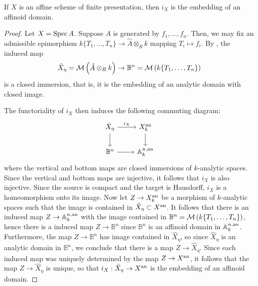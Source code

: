 \begin{lemma}\label{lemma:affinecaseisaffinoid}
    If $X$ is an affine scheme of finite presentation, then $i_X$ is the embedding of an affinoid domain.
\end{lemma}
\begin{proof}
    Let $X = \operatorname{Spec} A$.
    Suppose $A$ is generated by $f_1, \dots, f_n$.
    Then, we may fix an admissible epimorphism $k\{T_1, \dots, T_n\} \to \hat{A} \otimes_{R} k$ mapping $T_i \mapsto f_i$.
    By \parencite[Corollary 2.3.2]{berk1}, the induced map \[\hat{X}_{\eta} = \mathcal{M}\left(\hat{A} \otimes_{R} k\right) \to \mathbb{B}^{n} = \mathcal{M}\left(k\{T_1, \dots, T_n\}\right)\] is a closed immersion, that is, it is the embedding of an analytic domain with closed image.

    The functoriality of $i_X$ then induces the following commuting diagram:
    \[
    \begin{tikzcd}
        \hat{X}_{\eta} \arrow[d] \arrow[r,"i_X"]  & \anl{X_k} \arrow[d] \\
        \mathbb{B}^n \arrow[r] & \mathbb{A}^{n, \operatorname{an}}_{k}
    \end{tikzcd}
    \]
    where the vertical and bottom maps are closed immersions of $k$-analytic spaces.
    Since the vertical and bottom maps are injective, it follows that $i_X$ is also injective.
    Since the source is compact and the target is Hausdorff, $i_X$ is a homeomorphism onto its image.
    Now let $Z \to X_k^{\text{an}}$ be a morphism of $k$-analytic spaces such that the image is contained in $\hat{X}_{\eta} \subset X^{\text{an}}$.
    It follows that there is an induced map $Z \to \mathbb{A}^{n, \text{an}}_{k}$ with the image contained in $\mathbb{B}^{n} = \mathcal{M}\left(k\{T_1, \dots, T_n\}\right)$, hence there is a induced map $Z \to \mathbb{B}^{n}$ since $\mathbb{B}^{n}$ is an affinoid domain in $\mathbb{A}^{n, \text{an}}_{k}$.
    Furthermore, the map $Z \to \mathbb{B}^{n}$ has image contained in $\hat{X}_{\eta}$, so since $\hat{X}_{\eta}$ is an analytic domain in $\mathbb{B}^{n}$, we conclude that there is a map $Z \to \hat{X}_{\eta}$.
    Since each induced map was uniquely determined by the map $Z \to X^{\text{an}}$, it follows that the map $Z \to \hat{X}_{\eta}$ is unique, so that $i_X: \hat{X}_{\eta} \to X^{\text{an}}$ is the embedding of an affinoid domain.
\end{proof}

